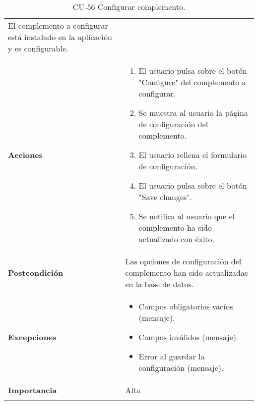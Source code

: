 \begin{longtable}[]{@{}ll@{}}
\begin{minipage}[t]{0.73\columnwidth}
El complemento a configurar está instalado en la aplicación y es
configurable.\strut
\end{minipage}\tabularnewline
\begin{minipage}[t]{0.21\columnwidth}\raggedright
\textbf{Acciones}\strut
\end{minipage} & \begin{minipage}[t]{0.73\columnwidth}\raggedright
\begin{enumerate}
\def\labelenumi{\arabic{enumi}.}
\tightlist
\item
  El usuario pulsa sobre el botón "Configure" del complemento a
  configurar.
\item
  Se muestra al usuario la página de configuración del complemento.
\item
  El usuario rellena el formulario de configuración.
\item
  El usuario pulsa sobre el botón "Save changes".
\item
  Se notifica al usuario que el complemento ha sido actualizado con
  éxito.
\end{enumerate}\strut
\end{minipage}\tabularnewline
\begin{minipage}[t]{0.21\columnwidth}\raggedright
\textbf{Postcondición}\strut
\end{minipage} & \begin{minipage}[t]{0.73\columnwidth}\raggedright
Las opciones de configuración del complemento han sido actualizadas en
la base de datos.\strut
\end{minipage}\tabularnewline
\begin{minipage}[t]{0.21\columnwidth}\raggedright
\textbf{Excepciones}\strut
\end{minipage} & \begin{minipage}[t]{0.73\columnwidth}\raggedright
\begin{itemize}
\tightlist
\item
  Campos obligatorios vacíos (mensaje).
\item
  Campos inválidos (mensaje).
\item
  Error al guardar la configuración (mensaje).
\end{itemize}\strut
\end{minipage}\tabularnewline
\begin{minipage}[t]{0.21\columnwidth}\raggedright
\textbf{Importancia}\strut
\end{minipage} & \begin{minipage}[t]{0.73\columnwidth}\raggedright
Alta\strut
\end{minipage}\tabularnewline
\bottomrule
\caption{CU-56 Configurar complemento.}
\end{longtable}

